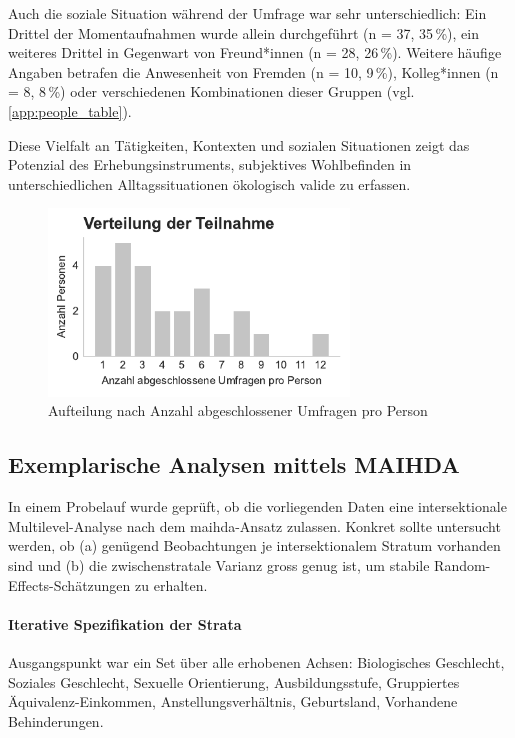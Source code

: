 Auch die soziale Situation während der Umfrage war sehr unterschiedlich: Ein Drittel der Momentaufnahmen wurde allein durchgeführt (n = 37, 35\,\%), ein weiteres Drittel in Gegenwart von Freund*innen (n = 28, 26\,\%). Weitere häufige Angaben betrafen die Anwesenheit von Fremden (n = 10, 9\,\%), Kolleg*innen (n = 8, 8\,\%) oder verschiedenen Kombinationen dieser Gruppen (vgl. \cref{app:people_table}).

Diese Vielfalt an Tätigkeiten, Kontexten und sozialen Situationen zeigt das Potenzial des Erhebungsinstruments, subjektives Wohlbefinden in unterschiedlichen Alltagssituationen ökologisch valide zu erfassen.



\begin{figure}[htbp]
    \centering
    \includegraphics[width=8cm]{analysis/plots/survey_counts.pdf}
    \caption{Aufteilung nach Anzahl abgeschlossener Umfragen pro Person}
    \label{fig:survey_counts}
\end{figure}


\subsection*{Exemplarische Analysen mittels MAIHDA}
\label{sec:pilot_maihda}

In einem Probelauf wurde geprüft, ob die vorliegenden Daten eine intersektionale Multilevel-Analyse nach dem \gls{maihda}-Ansatz zulassen. Konkret sollte untersucht werden, ob (a) genügend Beobachtungen je intersektionalem Stratum vorhanden sind und (b) die zwischenstratale Varianz gross genug ist, um stabile Random-Effects-Schätzungen zu erhalten.

\paragraph{Iterative Spezifikation der Strata}
Ausgangspunkt war ein Set über alle erhobenen Achsen: Biologisches Geschlecht, Soziales Geschlecht, Sexuelle Orientierung, Ausbildungsstufe, Gruppiertes Äquivalenz-Einkommen, Anstellungsverhältnis, Geburtsland, Vorhandene Behinderungen.

